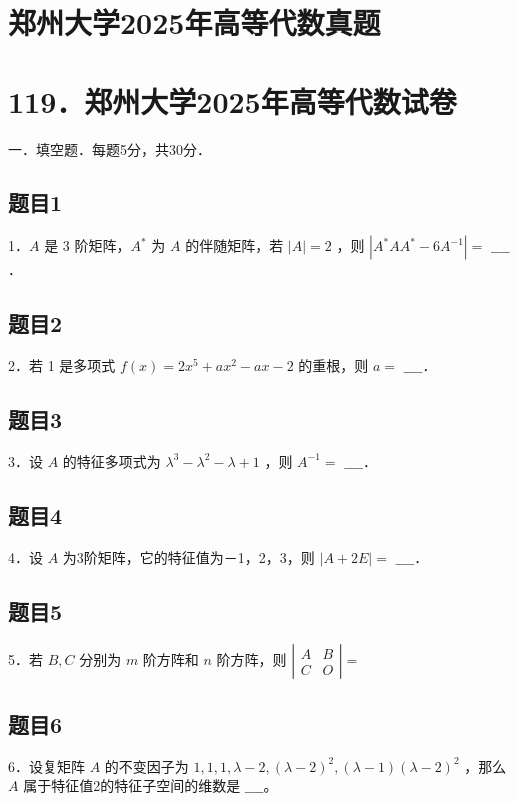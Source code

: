\documentclass{article}
\begin{document}
\section*{郑州大学2025年高等代数真题}
\section*{119．郑州大学2025年高等代数试卷}
一．填空题．每题5分，共30分．\\

\subsection{题目1}
1．\(A\) 是 3 阶矩阵，\(A^{*}\) 为 \(A\) 的伴随矩阵，若 \(|A|=2\) ，则 \(\left|A^{*} A A^{*}-6 A^{-1}\right|=\) \(\_\_\_\_\)．

\subsection{题目2}
2．若 1 是多项式 \(f(x)=2 x^{5}+a x^{2}-a x-2\) 的重根，则 \(a=\) \(\_\_\_\_\)．

\subsection{题目3}
3．设 \(A\) 的特征多项式为 \(\lambda^{3}-\lambda^{2}-\lambda+1\) ，则 \(A^{-1}=\) \(\_\_\_\_\)．

\subsection{题目4}
4．设 \(A\) 为3阶矩阵，它的特征值为－1，2，3，则 \(|A+2 E|=\) \(\_\_\_\_\)．

\subsection{题目5}
5．若 \(B, C\) 分别为 \(m\) 阶方阵和 \(n\) 阶方阵，则 \(\left|\begin{array}{ll}A & B \\ C & O\end{array}\right|=\)

\subsection{题目6}
6．设复矩阵 \(A\) 的不变因子为 \(1,1,1, \lambda-2,(\lambda-2)^{2},(\lambda-1)(\lambda-2)^{2}\) ，那么 \(A\) 属于特征值2的特征子空间的维数是 \(\_\_\_\_\)。
\end{document}
